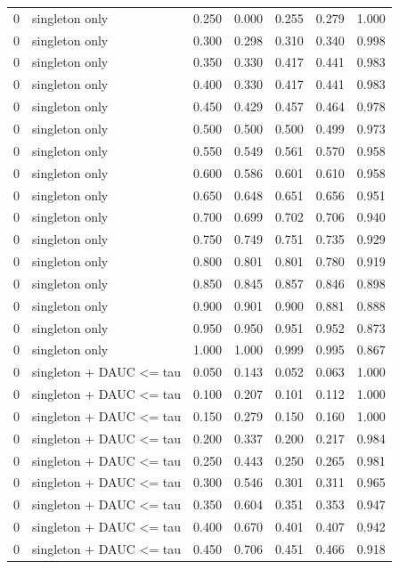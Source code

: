 \begin{tabular}{rlrrrrr}
0 & singleton only & 0.250 & 0.000 & 0.255 & 0.279 & 1.000 \\
0 & singleton only & 0.300 & 0.298 & 0.310 & 0.340 & 0.998 \\
0 & singleton only & 0.350 & 0.330 & 0.417 & 0.441 & 0.983 \\
0 & singleton only & 0.400 & 0.330 & 0.417 & 0.441 & 0.983 \\
0 & singleton only & 0.450 & 0.429 & 0.457 & 0.464 & 0.978 \\
0 & singleton only & 0.500 & 0.500 & 0.500 & 0.499 & 0.973 \\
0 & singleton only & 0.550 & 0.549 & 0.561 & 0.570 & 0.958 \\
0 & singleton only & 0.600 & 0.586 & 0.601 & 0.610 & 0.958 \\
0 & singleton only & 0.650 & 0.648 & 0.651 & 0.656 & 0.951 \\
0 & singleton only & 0.700 & 0.699 & 0.702 & 0.706 & 0.940 \\
0 & singleton only & 0.750 & 0.749 & 0.751 & 0.735 & 0.929 \\
0 & singleton only & 0.800 & 0.801 & 0.801 & 0.780 & 0.919 \\
0 & singleton only & 0.850 & 0.845 & 0.857 & 0.846 & 0.898 \\
0 & singleton only & 0.900 & 0.901 & 0.900 & 0.881 & 0.888 \\
0 & singleton only & 0.950 & 0.950 & 0.951 & 0.952 & 0.873 \\
0 & singleton only & 1.000 & 1.000 & 0.999 & 0.995 & 0.867 \\
0 & singleton + DAUC <= tau & 0.050 & 0.143 & 0.052 & 0.063 & 1.000 \\
0 & singleton + DAUC <= tau & 0.100 & 0.207 & 0.101 & 0.112 & 1.000 \\
0 & singleton + DAUC <= tau & 0.150 & 0.279 & 0.150 & 0.160 & 1.000 \\
0 & singleton + DAUC <= tau & 0.200 & 0.337 & 0.200 & 0.217 & 0.984 \\
0 & singleton + DAUC <= tau & 0.250 & 0.443 & 0.250 & 0.265 & 0.981 \\
0 & singleton + DAUC <= tau & 0.300 & 0.546 & 0.301 & 0.311 & 0.965 \\
0 & singleton + DAUC <= tau & 0.350 & 0.604 & 0.351 & 0.353 & 0.947 \\
0 & singleton + DAUC <= tau & 0.400 & 0.670 & 0.401 & 0.407 & 0.942 \\
0 & singleton + DAUC <= tau & 0.450 & 0.706 & 0.451 & 0.466 & 0.918 \\

\end{tabular}
